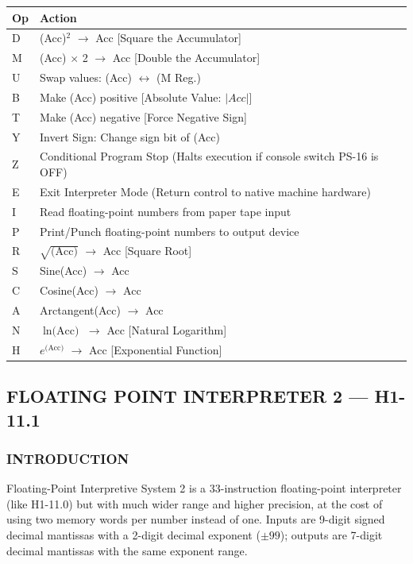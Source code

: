 \begin{table}[h]
\centering
\small
\ttfamily
\begin{tabularx}{\textwidth}{lX}
\toprule
\textbf{Op} & \textbf{Action} \\ 
\midrule
D & (Acc)$^2$ $\rightarrow$ Acc \hfill [Square the Accumulator] \\
M & (Acc) $\times$ 2 $\rightarrow$ Acc \hfill [Double the Accumulator] \\
U & Swap values: (Acc) $\longleftrightarrow$ (M Reg.) \\
B & Make (Acc) positive \hfill [Absolute Value: $|Acc|$] \\
T & Make (Acc) negative \hfill [Force Negative Sign] \\
Y & Invert Sign: Change sign bit of (Acc) \\
Z & Conditional Program Stop (Halts execution if console switch \textsf{PS-16} is \textsf{OFF}) \\
E & Exit Interpreter Mode (Return control to native machine hardware) \\
I & Read floating-point numbers from paper tape input \\
P & Print/Punch floating-point numbers to output device \\
R & $\sqrt{\text{(Acc)}}$ $\rightarrow$ Acc \hfill [Square Root] \\
S & Sine(Acc) $\rightarrow$ Acc \\
C & Cosine(Acc) $\rightarrow$ Acc \\
A & Arctangent(Acc) $\rightarrow$ Acc \\
N & $\ln\text{(Acc)}$ $\rightarrow$ Acc \hfill [Natural Logarithm] \\
H & $e^{\text{(Acc)}}$ $\rightarrow$ Acc \hfill [Exponential Function] \\
\bottomrule
\end{tabularx}
\end{table}
\newpage
\subsection*{FLOATING POINT INTERPRETER 2 --- H1-11.1}
\label{H1-11.1}

\subsubsection*{INTRODUCTION}

Floating-Point Interpretive System 2 is a 33-instruction floating-point interpreter (like H1-11.0) but with much wider range and higher precision, at the cost of using two memory words per number instead of one. Inputs are 9-digit signed decimal mantissas with a 2-digit decimal exponent ($\pm 99$); outputs are 7-digit decimal mantissas with the same exponent range.

